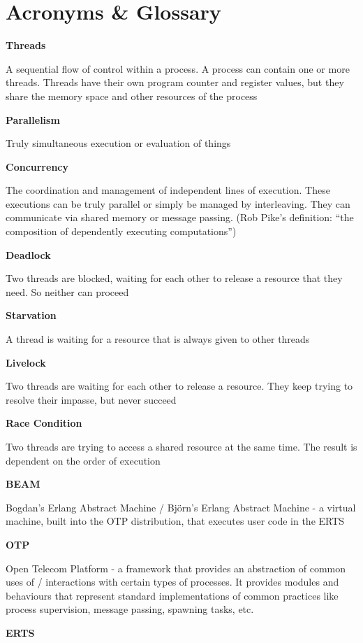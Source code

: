 \documentclass[]{final}
\begin{document}
\chapter{Acronyms \& Glossary}

\textbf{Threads}

A sequential flow of control within a process. A process can contain one or more threads.
Threads have their own program counter and register values, but they share the memory space
and other resources of the process

\textbf{Parallelism}

Truly simultaneous execution or evaluation of things

\textbf{Concurrency}

The coordination and management of independent lines of execution. These executions
can be truly parallel or simply be managed by interleaving. They can communicate
via shared memory or message passing. (Rob Pike's definition: “the composition of
dependently executing computations”)

\textbf{Deadlock}

Two threads are blocked, waiting for each other to release a resource that they need. So neither can proceed

\textbf{Starvation}

A thread is waiting for a resource that is always given to other threads

\textbf{Livelock}

Two threads are waiting for each other to release a resource. They keep trying to resolve their impasse, but never succeed

\textbf{Race Condition}

Two threads are trying to access a shared resource at the same time. The result is dependent on the order of execution

\textbf{BEAM}

Bogdan's Erlang Abstract Machine / Björn's Erlang Abstract Machine - a virtual machine, built into the OTP
distribution, that executes user code in the ERTS

\textbf{OTP}

Open Telecom Platform - a framework that provides an abstraction of common uses of / interactions with
certain types of processes. It provides modules and behaviours that represent standard implementations of
common practices like process supervision, message passing, spawning tasks, etc.

\textbf{ERTS}
\end{document}
